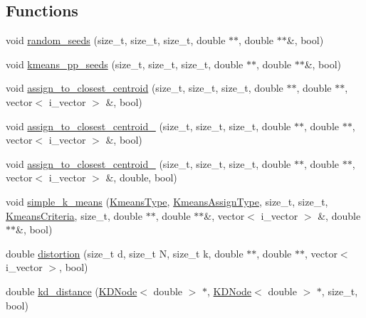 \subsection*{Functions}
\begin{DoxyCompactItemize}
\item 
void \hyperlink{namespaceSimpleCluster_aa3c1fa27364305d35f14eb0b6b984a10}{random\-\_\-seeds} (size\-\_\-t, size\-\_\-t, size\-\_\-t, double $\ast$$\ast$, double $\ast$$\ast$\&, bool)
\item 
void \hyperlink{namespaceSimpleCluster_ab1abfee692e0476f34c72ac18a68bf17}{kmeans\-\_\-pp\-\_\-seeds} (size\-\_\-t, size\-\_\-t, size\-\_\-t, double $\ast$$\ast$, double $\ast$$\ast$\&, bool)
\item 
void \hyperlink{namespaceSimpleCluster_aca74ac04af2feab94c72dcfe7a26fd9f}{assign\-\_\-to\-\_\-closest\-\_\-centroid} (size\-\_\-t, size\-\_\-t, size\-\_\-t, double $\ast$$\ast$, double $\ast$$\ast$, vector$<$ i\-\_\-vector $>$ \&, bool)
\item 
void \hyperlink{namespaceSimpleCluster_af66bb5dcaeacf5d9a3856fbf793115d5}{assign\-\_\-to\-\_\-closest\-\_\-centroid\-\_} (size\-\_\-t, size\-\_\-t, size\-\_\-t, double $\ast$$\ast$, double $\ast$$\ast$, vector$<$ i\-\_\-vector $>$ \&, bool)
\item 
void \hyperlink{namespaceSimpleCluster_ae3eb269fbf66080b629b367254abe6b7}{assign\-\_\-to\-\_\-closest\-\_\-centroid\-\_} (size\-\_\-t, size\-\_\-t, size\-\_\-t, double $\ast$$\ast$, double $\ast$$\ast$, vector$<$ i\-\_\-vector $>$ \&, double, bool)
\item 
void \hyperlink{namespaceSimpleCluster_a7bc3ccce11e60fd93ee92a1c4095c337}{simple\-\_\-k\-\_\-means} (\hyperlink{namespaceSimpleCluster_a8a8f57121b69a7b43575e4d6a53928e2}{Kmeans\-Type}, \hyperlink{namespaceSimpleCluster_a1ad2d6129171ff9a5ee57f48b5f3f6e1}{Kmeans\-Assign\-Type}, size\-\_\-t, size\-\_\-t, \hyperlink{structSimpleCluster_1_1KmeansCriteria}{Kmeans\-Criteria}, size\-\_\-t, double $\ast$$\ast$, double $\ast$$\ast$\&, vector$<$ i\-\_\-vector $>$ \&, double $\ast$$\ast$\&, bool)
\item 
double \hyperlink{namespaceSimpleCluster_a2b5ed423662d1968e1af5262812d7ca8}{distortion} (size\-\_\-t d, size\-\_\-t N, size\-\_\-t k, double $\ast$$\ast$, double $\ast$$\ast$, vector$<$ i\-\_\-vector $>$, bool)
\item 
double \hyperlink{namespaceSimpleCluster_a35cd22686dbc96142da1962ac88caaed}{kd\-\_\-distance} (\hyperlink{classSimpleCluster_1_1KDNode}{K\-D\-Node}$<$ double $>$ $\ast$, \hyperlink{classSimpleCluster_1_1KDNode}{K\-D\-Node}$<$ double $>$ $\ast$, size\-\_\-t, bool)
$$
\end{DoxyCompactItemize}
